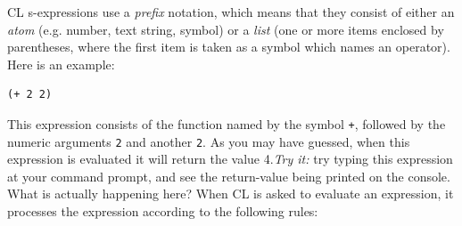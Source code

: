 \documentclass [11pt]{book}
\begin{document}
CL s-expressions use a  \emph{prefix} notation, which means that they consist of either an \emph{atom} (e.g.  number, text string, symbol) or a \emph{list} (one or more items enclosed by parentheses, where the
	  first item is taken as a symbol which names an
	  operator). Here is an example: 

\begin{verbatim}(+ 2 2)
\end{verbatim}This expression consists of the function named by the symbol \texttt{+}, followed by the numeric arguments \texttt{2} and another \texttt{2}. As you may have guessed, when this expression is evaluated it will return the value 4.\emph{Try it: }try typing this expression at your command prompt, and see
the return-value being printed on the console. What is actually
happening here? When CL is asked to evaluate an expression, it
processes the expression according to the following rules:
\end{document}
